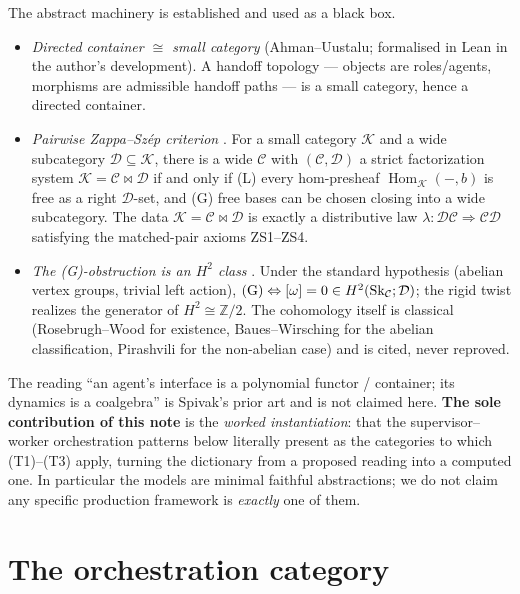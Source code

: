 \documentclass[11pt]{article}
\theoremstyle{definition}
\newcommand{\Hom}{\operatorname{Hom}}
\newcommand{\C}{\mathcal{C}}
\newcommand{\D}{\mathcal{D}}
\newcommand{\K}{\mathcal{K}}
\newcommand{\Sk}{\mathrm{Sk}}
\begin{document}
The abstract machinery is established and used as a black box.
\begin{itemize}
\item[\textbf{(T1)}] \emph{Directed container $\cong$ small category} (Ahman--Uustalu;
formalised in Lean in the author's development). A handoff topology --- objects are
roles/agents, morphisms are admissible handoff paths --- is a small category, hence
a directed container.
\item[\textbf{(T2)}] \emph{Pairwise Zappa--Sz\'ep criterion} \cite{pairwise}. For a
small category $\K$ and a wide subcategory $\D\subseteq\K$, there is a wide $\C$
with $(\C,\D)$ a strict factorization system $\K=\C\bowtie\D$ if and only if
\textnormal{(L)} every hom-presheaf $\Hom_\K(-,b)$ is free as a right $\D$-set, and
\textnormal{(G)} free bases can be chosen closing into a wide subcategory. The data
$\K=\C\bowtie\D$ is exactly a distributive law $\lambda:\D\C\Rightarrow\C\D$
satisfying the matched-pair axioms ZS1--ZS4.
\item[\textbf{(T3)}] \emph{The (G)-obstruction is an $H^2$ class} \cite{gobstr}.
Under the standard hypothesis (abelian vertex groups, trivial left action),
$\textnormal{(G)}\Leftrightarrow[\omega]=0\in H^2(\Sk_\C;\D)$; the rigid twist
realizes the generator of $H^2\cong\mathbb Z/2$. The cohomology itself is classical
(Rosebrugh--Wood for existence, Baues--Wirsching for the abelian classification,
Pirashvili for the non-abelian case) and is cited, never reproved.
\end{itemize}

The reading ``an agent's interface is a polynomial functor / container; its dynamics
is a coalgebra'' is Spivak's prior art and is not claimed here. \textbf{The sole
contribution of this note} is the \emph{worked instantiation}: that the
supervisor--worker orchestration patterns below literally present as the categories
to which (T1)--(T3) apply, turning the dictionary from a proposed reading into a
computed one. In particular the models are minimal faithful abstractions; we do not
claim any specific production framework is \emph{exactly} one of them.

\section{The orchestration category}\label{sec:model}
\end{document}
